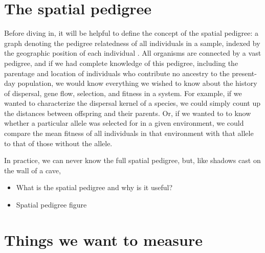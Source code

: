 \documentclass{ar-1col}
\begin{document}
\section{The spatial pedigree}
Before diving in, 
it will be helpful to define the concept of the spatial pedigree: 
a graph denoting the pedigree relatedness of all individuals in a sample, 
indexed by the geographic position of each individual .
All organisms are connected by a vast pedigree, 
and if we had complete knowledge of this pedigree, 
including the parentage and location of individuals 
who contribute no ancestry to the present-day population, 
we would know everything we wished to know about 
the history of dispersal, gene flow, 
selection, and fitness in a system.
For example, if we wanted to characterize the dispersal kernel of a species, 
we could simply count up the distances between offspring and their parents.
Or, if we wanted to to know whether a particular allele 
was selected for in a given environment, 
we could compare the mean fitness of all individuals in that environment with that allele 
to that of those without the allele.

In practice, we can never know the full spatial pedigree,
but, like shadows cast on the wall of a cave,


\begin{itemize}
\item What is the spatial pedigree and why is it useful?
\item Spatial pedigree figure
\end{itemize}

\section{Things we want to measure}
\end{document}

